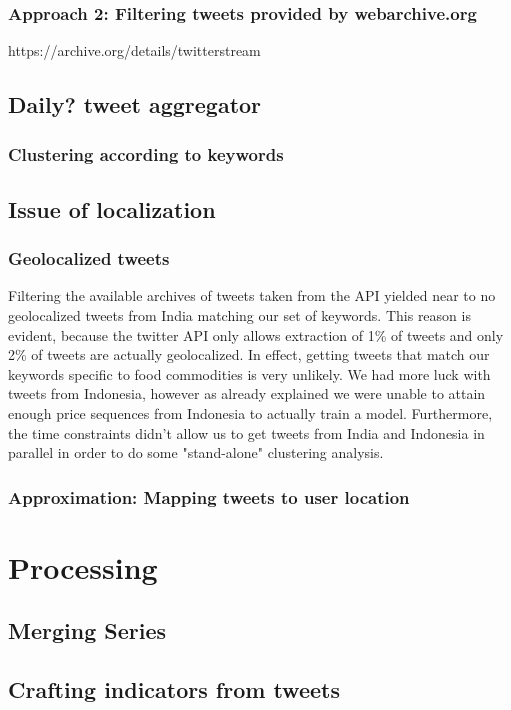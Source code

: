 \subsubsection*{Approach 2: Filtering tweets provided by webarchive.org}
https://archive.org/details/twitterstream

\subsection*{Daily? tweet aggregator}

\subsubsection*{Clustering according to keywords}

\subsection*{Issue of localization}

\subsubsection*{Geolocalized tweets}
Filtering the available archives of tweets taken from the API yielded near to no geolocalized tweets from India matching our set of keywords. This reason is evident, because the twitter API only allows extraction of 1\% of tweets and only 2\% of tweets are actually geolocalized. In effect, getting tweets that match our keywords specific to food commodities is very unlikely. We had more luck with tweets from Indonesia, however as already explained we were unable to attain enough price sequences from Indonesia to actually train a model. Furthermore, the time constraints didn't allow us to get tweets from India and Indonesia in parallel in order to do some "stand-alone" clustering analysis.

\subsubsection*{Approximation: Mapping tweets to user location}


\section*{Processing}

\subsection*{Merging Series}

\subsection*{Crafting indicators from tweets}